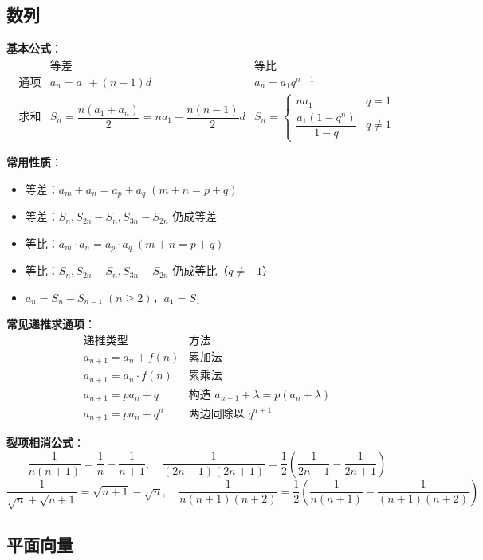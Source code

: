 \subsection{数列}

\textbf{基本公式}：
\[
\begin{array}{c|c|c}
& \text{等差} & \text{等比} \\ \hline
\text{通项} & a_n = a_1 + (n-1)d & a_n = a_1 q^{n-1} \\
\text{求和} & S_n = \dfrac{n(a_1+a_n)}{2} = na_1 + \dfrac{n(n-1)}{2}d & S_n = \begin{cases}na_1 & q=1\\ \dfrac{a_1(1-q^n)}{1-q} & q\neq 1\end{cases}
\end{array}
\]

\textbf{常用性质}：
\begin{itemize}
  \item 等差：$a_m + a_n = a_p + a_q \;(m+n=p+q)$
  \item 等差：$S_n, S_{2n}-S_n, S_{3n}-S_{2n}$ 仍成等差
  \item 等比：$a_m \cdot a_n = a_p \cdot a_q \;(m+n=p+q)$
  \item 等比：$S_n, S_{2n}-S_n, S_{3n}-S_{2n}$ 仍成等比（$q\neq -1$）
  \item $a_n = S_n - S_{n-1}\;(n\ge 2)$，$a_1 = S_1$
\end{itemize}

\textbf{常见递推求通项}：
\[
\begin{array}{c|c}
\text{递推类型} & \text{方法} \\ \hline
a_{n+1} = a_n + f(n) & \text{累加法} \\
a_{n+1} = a_n \cdot f(n) & \text{累乘法} \\
a_{n+1} = pa_n + q & \text{构造 $a_{n+1}+\lambda = p(a_n+\lambda)$} \\
a_{n+1} = pa_n + q^n & \text{两边同除以 $q^{n+1}$}
\end{array}
\]

\textbf{裂项相消公式}：
\[
\frac{1}{n(n+1)} = \frac{1}{n} - \frac{1}{n+1},\quad
\frac{1}{(2n-1)(2n+1)} = \frac12\!\left(\frac{1}{2n-1} - \frac{1}{2n+1}\right)
\]
\[
\frac{1}{\sqrt{n}+\sqrt{n+1}} = \sqrt{n+1} - \sqrt{n},\quad
\frac{1}{n(n+1)(n+2)} = \frac12\!\left(\frac{1}{n(n+1)} - \frac{1}{(n+1)(n+2)}\right)
\]

\subsection{平面向量}

